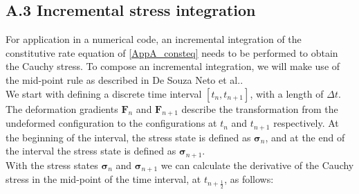 \subsection*{A.3 Incremental stress integration}
%
For application in a numerical code, an incremental integration of the constitutive rate equation of \ref{AppA_consteq} needs to be performed to obtain the Cauchy stress. To compose an incremental integration, we will make use of the mid-point rule as described in De Souza Neto et al.\cite{compmethodsplasticity}{\color{red}{check this reference}}.\\ 
\newline
We start with defining a discrete time interval $[t_n, t_{n+1}]$, with a length of $\Delta t$. The deformation gradients $\boldsymbol{F}_n$ and $\boldsymbol{F}_{n+1}$ describe the transformation from the undeformed configuration to the configurations at $t_n$ and $t_{n+1}$ respectively. At the beginning of the interval, the stress state is defined as $\boldsymbol{\sigma}_n$, and at the end of the interval the stress state is defined as $\boldsymbol{\sigma}_{n+1}$.\\
\newline
With the stress states $\boldsymbol{\sigma}_n$ and $\boldsymbol{\sigma}_{n+1}$ we can calculate the derivative of the Cauchy stress in the mid-point of the time interval, at $t_{n+\frac{1}{2}}$, as follows:
